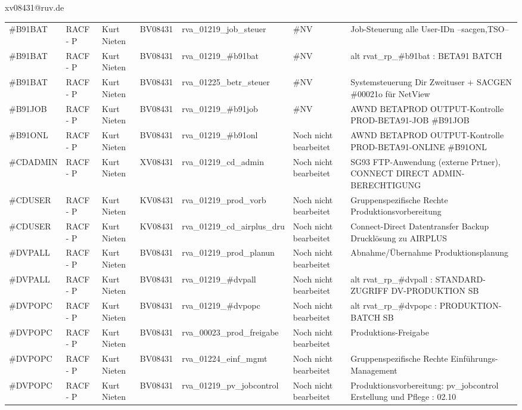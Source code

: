 \documentclass[a4paper,landscape,12pt]{letter}
\begin{document}
\begin{letter}{xv08431@ruv.de\hfill \break}
\begin{tiny}
\begin{longtable}{|p{35mm}|p{15mm}|p{25mm}|p{10mm}|p{40mm}|p{50mm}|p{50mm}|}
\#B91BAT & RACF - P & Kurt Nieten & BV08431 & rva\_01219\_job\_steuer & \#NV & Job-Steuerung alle User-IDn --sacgen,TSO-- \\
\#B91BAT & RACF - P & Kurt Nieten & BV08431 & rva\_01219\_\#b91bat & \#NV & alt rvat\_rp\_\#b91bat          : BETA91 BATCH \\
\#B91BAT & RACF - P & Kurt Nieten & BV08431 & rva\_01225\_betr\_steuer & \#NV & Systemsteuerung Dir Zweituser + SACGEN \#00021o für NetView \\
\#B91JOB & RACF - P & Kurt Nieten & BV08431 & rva\_01219\_\#b91job & \#NV & AWND BETAPROD OUTPUT-Kontrolle PROD-BETA91-JOB \#B91JOB \\
\#B91ONL & RACF - P & Kurt Nieten & BV08431 & rva\_01219\_\#b91onl & Noch nicht bearbeitet & AWND BETAPROD OUTPUT-Kontrolle PROD-BETA91-ONLINE \#B91ONL \\
\#CDADMIN & RACF - P & Kurt Nieten & XV08431 & rva\_01219\_cd\_admin & Noch nicht bearbeitet & SG93 FTP-Anwendung (externe Prtner), CONNECT DIRECT ADMIN-BERECHTIGUNG \\
\#CDUSER & RACF - P & Kurt Nieten & KV08431 & rva\_01219\_prod\_vorb & Noch nicht bearbeitet & Gruppenspezifische Rechte Produktionsvorbereitung \\
\#CDUSER & RACF - P & Kurt Nieten & KV08431 & rva\_01219\_cd\_airplus\_dru & Noch nicht bearbeitet & Connect-Direct Datentransfer Backup Drucklösung zu AIRPLUS \\
\#DVPALL & RACF - P & Kurt Nieten & BV08431 & rva\_01219\_prod\_planun & Noch nicht bearbeitet & Abnahme/Übernahme Produktionsplanung \\
\#DVPALL & RACF - P & Kurt Nieten & BV08431 & rva\_01219\_\#dvpall & Noch nicht bearbeitet & alt rvat\_rp\_\#dvpall          : STANDARD-ZUGRIFF DV-PRODUKTION SB \\
\#DVPOPC & RACF - P & Kurt Nieten & BV08431 & rva\_01219\_\#dvpopc & Noch nicht bearbeitet & alt rvat\_rp\_\#dvpopc          : PRODUKTION-BATCH SB \\
\#DVPOPC & RACF - P & Kurt Nieten & BV08431 & rva\_00023\_prod\_freigabe & Noch nicht bearbeitet & Produktions-Freigabe \\
\#DVPOPC & RACF - P & Kurt Nieten & BV08431 & rva\_01224\_einf\_mgmt & Noch nicht bearbeitet & Gruppenspezifische Rechte Einführungs-Management \\
\#DVPOPC & RACF - P & Kurt Nieten & BV08431 & rva\_01219\_pv\_jobcontrol & Noch nicht bearbeitet & Produktionsvorbereitung: pv\_jobcontrol Erstellung und Pflege : 02.10 \\

\end{longtable}
\end{tiny}
\end{letter}
\end{document}
